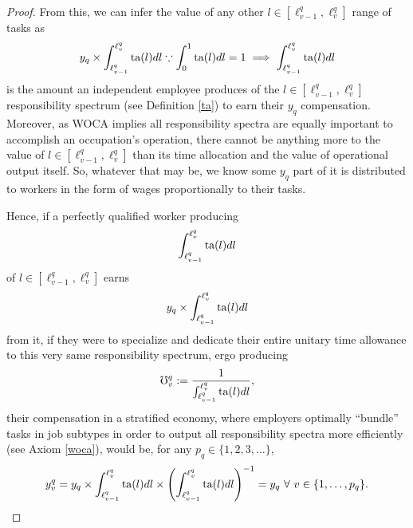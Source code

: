 \documentclass[hidelinks, nonatbib]{elsarticle}
\begin{document}
\begin{lemma}
\begin{proof}
        From this, we can infer the value of any other $l \in [\ell_{v-1}^{q}, \ell_{v}^{q}]$ range of tasks as
        \begin{gather}
            y_q
            \times
            \int_{\ell_{v-1}^{q}}^{\ell_{v}^{q}}
            \text{ta}(l)
            dl
            \because
            \int_{0}^{1}
            \text{ta}(l)
            dl
            =
            1
            \implies
            \int_{\ell_{v-1}^{q}}^{\ell_{v}^{q}}
            \text{ta}(l)
            dl
        \end{gather}
        is the amount an independent employee produces of the $l \in [\ell_{v-1}^{q}, \ell_{v}^{q}]$ responsibility spectrum (see Definition \ref{ta}) to earn their $y_q$ compensation. Moreover, as WOCA implies all responsibility spectra are equally important to accomplish an occupation's operation, there cannot be anything more to the value of $l \in [\ell_{v-1}^{q}, \ell_{v}^{q}]$ than its time allocation and the value of operational output itself. So, whatever that may be, we know some $y_q$ part of it is distributed to workers in the form of wages proportionally to their tasks.

        Hence, if a perfectly qualified worker producing
        \begin{gather}
            \int_{\ell_{v-1}^{q}}^{\ell_{v}^{q}}
            \text{ta}(l)
            dl
        \end{gather}
        of $l \in [\ell_{v-1}^{q}, \ell_{v}^{q}]$ earns
        \begin{gather}
            y_q
            \times
            \int_{\ell_{v-1}^{q}}^{\ell_{v}^{q}}
            \text{ta}(l)
            dl
        \end{gather}
        from it, if they were to specialize and dedicate their entire unitary time allowance to this very same responsibility spectrum, ergo producing
        \begin{gather}
            \mho_{v}^{q}
            :=
            \frac{1}{
                \int_{\ell_{v-1}^{q}}^{\ell_{v}^{q}}
                \text{ta}(l)
                dl
            }
            ,
        \end{gather}
        their compensation in a stratified economy, where employers optimally ``bundle'' tasks in job subtypes in order to output all responsibility spectra more efficiently (see Axiom \ref{woca}), would be, for any
        $p_q \in \{1, 2, 3, \dots\}$,
        \begin{gather}
            y_{v}^{q}
            =
            y_q
            \times
            \int_{\ell_{v-1}^{q}}^{\ell_{v}^{q}}
            \text{ta}(l)
            dl
            \times
            \left(
                \int_{\ell_{v-1}^{q}}^{\ell_{v}^{q}}
                \text{ta}(l)
                dl
            \right) ^ {-1}
            =
            y_q
            \
            \forall
            \
            v \in \{1, \dots, p_q\}
            .
        \end{gather}
    \end{proof}
\end{lemma} 
\end{document}
